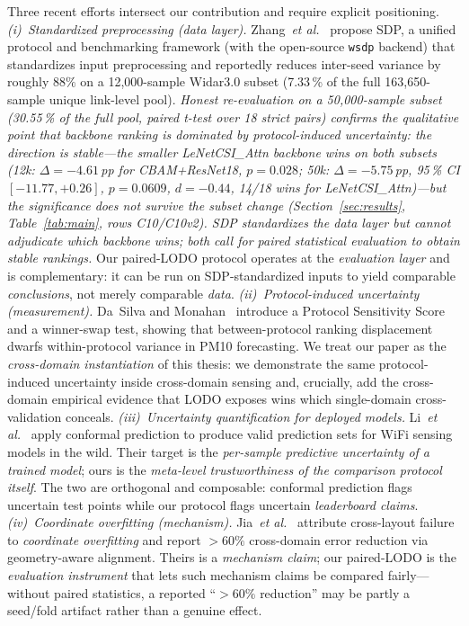 \documentclass[11pt]{article}
\theoremstyle{definition}
\newcommand{\CSI}{\text{CSI}}
\newcommand{\etal}{\textit{et al.}}
\begin{document}
Three recent efforts intersect our contribution and require explicit positioning.
\emph{(i)~Standardized preprocessing (data layer).} Zhang~\etal~\cite{zhang2026sdp}
propose SDP, a unified protocol and benchmarking framework (with the open-source
\texttt{wsdp} backend) that standardizes \CSI{} input preprocessing and reportedly
reduces inter-seed variance by roughly $88\%$ on a 12,000-sample Widar3.0 subset (7.33\,\% of the full 163{,}650-sample unique link-level pool). \emph{Honest re-evaluation on a 50{,}000-sample subset (30.55\,\% of the full pool, paired t-test over 18 strict pairs) confirms the qualitative point that backbone ranking is dominated by protocol-induced uncertainty: the direction is stable---the smaller LeNetCSI\_Attn backbone wins on both subsets (12k: $\Delta = -4.61$\,pp for CBAM+ResNet18, $p = 0.028$; 50k: $\Delta = -5.75$\,pp, 95\,\% CI $[-11.77, +0.26]$, $p = 0.0609$, $d = -0.44$, 14/18 wins for LeNetCSI\_Attn)---but the significance does not survive the subset change (Section~\ref{sec:results}, Table~\ref{tab:main}, rows C10/C10v2). SDP standardizes the \emph{data layer} but cannot adjudicate which backbone wins; both call for paired statistical evaluation to obtain stable rankings.}
Our paired-LODO protocol operates at the \emph{evaluation layer} and is complementary: it can be run on
SDP-standardized inputs to yield comparable \emph{conclusions}, not merely
comparable \emph{data}.
\emph{(ii)~Protocol-induced uncertainty (measurement).} Da~Silva and Monahan~\cite{dasilva2026pss}
introduce a Protocol Sensitivity Score and a winner-swap test, showing that
between-protocol ranking displacement dwarfs within-protocol variance in PM10
forecasting. We treat our paper as the \emph{cross-domain instantiation} of this
thesis: we demonstrate the same protocol-induced uncertainty inside cross-domain
\CSI{} sensing and, crucially, add the cross-domain empirical evidence that LODO
exposes wins which single-domain cross-validation conceals.
\emph{(iii)~Uncertainty quantification for deployed models.} Li~\etal~\cite{li2026conformal}
apply conformal prediction to produce valid prediction sets for WiFi sensing models
in the wild. Their target is the \emph{per-sample predictive uncertainty of a trained
model}; ours is the \emph{meta-level trustworthiness of the comparison protocol
itself}. The two are orthogonal and composable: conformal prediction flags uncertain
test points while our protocol flags uncertain \emph{leaderboard claims}.
\emph{(iv)~Coordinate overfitting (mechanism).} Jia~\etal~\cite{chen2026perceptalign}
attribute cross-layout failure to \emph{coordinate overfitting} and report $>60\%$
cross-domain error reduction via geometry-aware alignment. Theirs is a
\emph{mechanism claim}; our paired-LODO is the \emph{evaluation instrument} that
lets such mechanism claims be compared fairly---without paired statistics, a reported
``$>60\%$ reduction'' may be partly a seed/fold artifact rather than a genuine effect.
\end{document}
